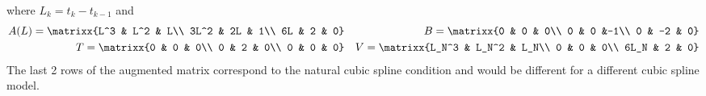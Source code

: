 where $L_k=t_k-t_{k-1}$ and
\begin{align*}
    A(L)=\matrixx{L^3 & L^2 & L\\ 3L^2 & 2L & 1\\ 6L & 2 & 0}& &B=\matrixx{0 & 0 & 0\\ 0 & 0 &-1\\ 0 & -2 & 0}\\
    T=\matrixx{0 & 0 & 0\\ 0 & 2 & 0\\ 0 & 0 & 0}& &V=\matrixx{L_N^3 & L_N^2 & L_N\\ 0 & 0 & 0\\ 6L_N & 2 & 0}
\end{align*}
The last 2 rows of the augmented matrix correspond to the natural cubic spline condition and would be different for a different cubic spline model.
